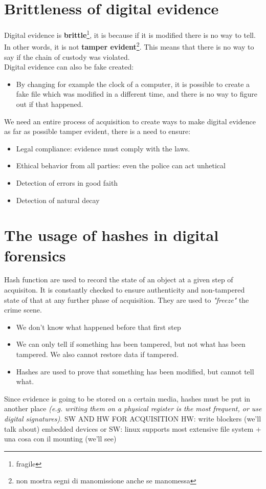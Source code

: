 \section{Brittleness of digital evidence}
    Digital evidence is \textbf{brittle}\footnote{fragile}, it is because if it is modified there is no way to tell. In other words, it is not \textbf{tamper evident}\footnote{non mostra segni di manomissione anche se manomessa}. This means that there is no way to say if the chain of custody was violated.\\
    Digital evidence can also be fake created:
    \begin{itemize}
        \item By changing for example the clock of a computer, it is possible to create a fake file which was modified in a different time, and there is no way to figure out if that happened.
    \end{itemize}
    We need an entire process of acquisition to create ways to make digital evidence as far as possible tamper evident, there is a need to ensure:
    \begin{itemize}
        \item Legal compliance: evidence must comply with the laws.
        \item Ethical behavior from all parties: even the police can act unhetical
        \item Detection of errors in good faith 
        \item Detection of natural decay
    \end{itemize}
\section{The usage of hashes in digital forensics}
    Hash function are used to record the state of an object at a given step of acquisiton. It is constantly checked to ensure authenticity and non-tampered state of that at any further phase of acquisition. They are used to \textit{"freeze"} the crime scene.
    \begin{itemize}
        \item We don't know what happened before that first step
        \item We can only tell if something has been tampered, but not what has been tampered. We also cannot restore data if tampered.
        \item Hashes are used to prove that something has been modified, but cannot tell what.
    \end{itemize}   
    Since evidence is going to be stored on a certain media, hashes must be put in another place \textit{(e.g. writing them on a physical register is the most frequent, or use digital signatures)}.
\iffalse
SW AND HW FOR ACQUISITION
    HW: write blockers (we'll talk about)
        embedded devices 
        or
        SW: linux supports most extensive file system + una cosa con il mounting (we'll see)


